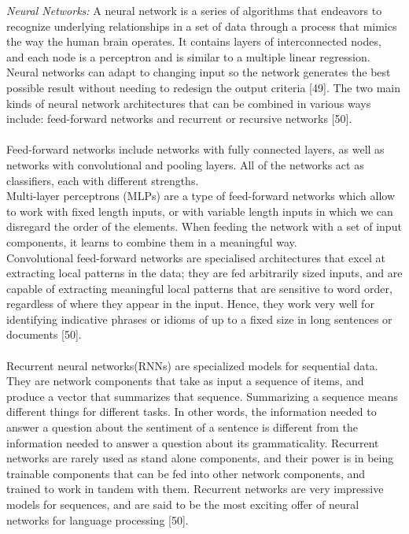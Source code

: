 \documentclass[a4paper]{article}
\begin{document}
\textit{Neural Networks:} A neural network is a series of algorithms that endeavors to recognize underlying relationships in a set of data through a process that mimics the way the human brain operates. It contains layers of interconnected nodes, and each node is a perceptron and is similar to a multiple linear regression. Neural networks can adapt to changing input so the network generates the best possible result without needing to redesign the output criteria [49].  The two main kinds of neural network architectures that can be combined in various ways include: feed-forward networks and recurrent or recursive networks [50]. \\ \\
Feed-forward networks include networks with fully connected layers, as well as networks with convolutional and pooling layers. All of the networks act as classifiers, each with different strengths. \\
Multi-layer perceptrons (MLPs) are a type of feed-forward networks which allow to work with fixed length inputs, or with variable length inputs in which we can disregard the order of the elements. When feeding the network with a set of input components, it learns to combine them in  a meaningful way. \\
Convolutional feed-forward networks are specialised architectures that excel at extracting local patterns in the data; they are fed arbitrarily sized inputs, and are capable of extracting meaningful local patterns that are sensitive to word order, regardless of where they appear in the input. Hence, they work very well for identifying indicative phrases or idioms of up to a fixed size in long sentences or documents [50]. 
\\ \\
Recurrent neural networks(RNNs) are specialized models for sequential data. They are network components that take as input a sequence of items, and produce a vector that summarizes that sequence. Summarizing a sequence means different things for different tasks. In other words, the information needed to answer a question about the sentiment of a sentence is different from the information needed to answer a question about its grammaticality.  Recurrent networks are rarely used as stand alone components, and their power is in being trainable components that can be fed into other network components, and trained to work in tandem with them. Recurrent networks are very impressive models for sequences, and are said to be the most exciting offer of neural networks for language processing [50]. \\ \\
\end{document}
